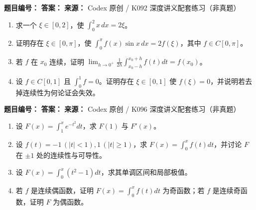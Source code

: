 \begin{problemBox}
\begin{problemMeta}
\textbf{题目编号：}  \quad
\textbf{答案：}  \quad
\textbf{来源：} Codex 原创 / K092 深度讲义配套练习（非真题）
\end{problemMeta}
\begin{enumerate}
  \item[\textbf{A}] 求一个 \(\xi\in[0,2]\)，使 \(\int_0^2x\,dx=2\xi\)。
  \item[\textbf{B}] 证明存在 \(\xi\in[0,\pi]\)，使 \(\int_0^\pi f(x)\sin x\,dx=2f(\xi)\)，其中 \(f\in C[0,\pi]\)。
  \item[\textbf{C}] 若 \(f\) 在 \(x_0\) 连续，证明 \(\lim_{h\to0^+}\frac1{2h}\int_{x_0-h}^{x_0+h}f(t)dt=f(x_0)\)。
  \item[\textbf{M}] 设 \(f\in C[0,1]\) 且 \(\int_0^1f=0\)。证明存在 \(\xi\in[0,1]\) 使 \(f(\xi)=0\)，并说明若去掉连续性为何论证会失效。
\end{enumerate}
\end{problemBox}

\begin{problemBox}
\begin{problemMeta}
\textbf{题目编号：}  \quad
\textbf{答案：}  \quad
\textbf{来源：} Codex 原创 / K096 深度讲义配套练习（非真题）
\end{problemMeta}
\begin{enumerate}
  \item[\textbf{A}] 设 \(F(x)=\int_1^xe^{-t^2}dt\)，求 \(F(1)\) 与 \(F'(x)\)。
  \item[\textbf{B}] 设 \(f(t)=-1\,(|t|<1),1\,(|t|\ge1)\)，求 \(F(x)=\int_0^xf(t)dt\)，并讨论 \(F\) 在 \(\pm1\) 处的连续性与可导性。
  \item[\textbf{C}] 设 \(F(x)=\int_0^x(t^2-1)dt\)，求其单调区间和局部极值。
  \item[\textbf{M}] 若 \(f\) 是连续偶函数，证明 \(F(x)=\int_0^xf(t)dt\) 为奇函数；若 \(f\) 是连续奇函数，证明 \(F\) 为偶函数。
\end{enumerate}
\end{problemBox}

